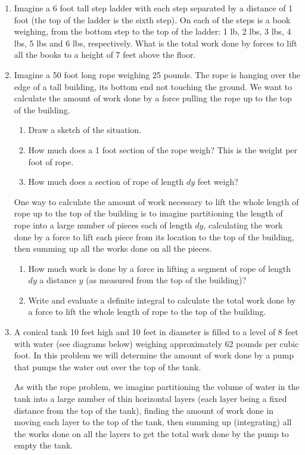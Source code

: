 \documentclass[12pt,letterpaper,fleqn]{article}
\theoremstyle{definition}
\begin{document}
\begin{enumerate}
 \item Imagine a 6 foot tall step ladder with each step separated by a distance of 1 foot (the top of the ladder is the sixth step). On each of the steps is a book weighing, from the bottom step to the top of the ladder: 1 lb, 2 lbs, 3 lbs, 4 lbs, 5 lbs and 6 lbs, respectively. What is the total work done by forces to lift all the books to a height of 7 feet above the floor.
 \item Imagine a 50 foot long rope weighing 25 pounds. The rope is hanging over the edge of a tall building, its bottom end not touching the ground. We want to calculate the amount of work done by a force pulling the rope up to the top of the building.
       \begin{enumerate}
        \item Draw a sketch of the situation.
        \item How much does a 1 foot section of the rope weigh? This is the weight per foot of rope.
        \item How much does a section of rope of length $dy$ feet weigh?
       \end{enumerate}
       One way to calculate the amount of work necessary to lift the whole length of rope up to the top of the building is to imagine partitioning the length of rope into a large number of pieces each of length $dy$, calculating the work done by a force to lift each piece from its location to the top of the building, then summing up all the works done on all the pieces.
       \begin{enumerate}[resume]
        \item How much work is done by a force in lifting a segment of rope of length $dy$ a distance $y$ (as measured from the top of the building)?
        \item Write and evaluate a definite integral to calculate the total work done by a force to lift the whole length of rope to the top of the building.
       \end{enumerate}
       \newpage
 \item A conical tank 10 feet high and 10 feet in diameter is filled to a level of 8 feet with water (see diagrams below) weighing approximately 62 pounds per cubic foot. In this problem we will determine the amount of work done by a pump that pumps the water out over the top of the tank.

       As with the rope problem, we imagine partitioning the volume of water in the tank into a large number of thin horizontal layers (each layer being a fixed distance from the top of the tank), finding the amount of work done in moving each layer to the top of the tank, then summing up (integrating) all the works done on all the layers to get the total work done by the pump to empty the tank.


\end{enumerate}
\end{document}
